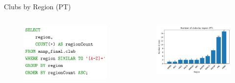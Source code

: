 \documentclass[aspectratio=169, xcolor=dvipsnames]{beamer}
\begin{document}
\begin{frame}{Clubs by Region (PT)}
\begin{columns}[c]
\begin{column}{.45\textwidth}
\begin{figure}
    \centering
    \includegraphics[width=\textwidth]{img/sql/clubsregionpt.png}
\end{figure}
\end{column}

\begin{column}{.55\textwidth}
\begin{figure}
    \centering
    \includegraphics[width=\textwidth]{img/clubsbyregion-pt.png}
\end{figure}
\end{column}
\end{columns}
\end{frame}
\end{document}

